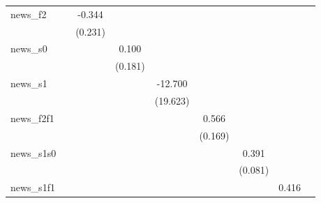 {\begin{tabular}{l*{8}{c}}
\addlinespace
news\_f2     &                     &      -0.344         &                     &                     &                     &                     &                     &                     \\
            &                     &     (0.231)         &                     &                     &                     &                     &                     &                     \\
\addlinespace
news\_s0     &                     &                     &       0.100         &                     &                     &                     &                     &                     \\
            &                     &                     &     (0.181)         &                     &                     &                     &                     &                     \\
\addlinespace
news\_s1     &                     &                     &                     &     -12.700         &                     &                     &                     &                     \\
            &                     &                     &                     &    (19.623)         &                     &                     &                     &                     \\
\addlinespace
news\_f2f1   &                     &                     &                     &                     &       0.566\sym{***}&                     &                     &                     \\
            &                     &                     &                     &                     &     (0.169)         &                     &                     &                     \\
\addlinespace
news\_s1s0   &                     &                     &                     &                     &                     &       0.391\sym{***}&                     &                     \\
            &                     &                     &                     &                     &                     &     (0.081)         &                     &                     \\
\addlinespace
news\_s1f1   &                     &                     &                     &                     &                     &                     &       0.416\sym{**} &                     \\

\end{tabular}}
